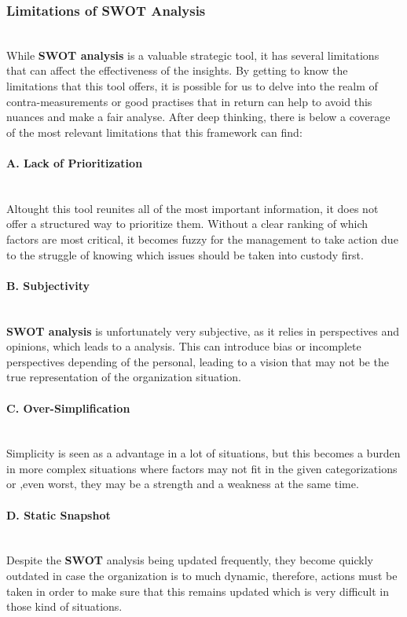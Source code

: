 \subsubsection{Limitations of SWOT Analysis}\mbox{}\\
While \textbf{SWOT analysis} is a valuable strategic tool, it has several limitations that can affect the effectiveness of the insights. By getting to know the limitations that this tool offers, it is possible for us to delve into the realm of contra-measurements or good practises that in return can help to avoid this nuances and make a fair analyse. After deep thinking, there is below a coverage of the most relevant limitations that this framework can find:

\paragraph{A. Lack of Prioritization}\mbox{}\\
Altought this tool reunites all of the most important information, it does not offer a structured way to prioritize them. Without a clear ranking of which factors are most critical, it becomes fuzzy for the management to take action due to the struggle of knowing which issues should be taken into custody first.

\paragraph{B. Subjectivity}\mbox{}\\
\textbf{SWOT analysis} is unfortunately very subjective, as it relies in perspectives and opinions, which leads to a analysis. This can introduce bias or incomplete perspectives depending of the personal, leading to a vision that may not be the true representation of the organization situation. 

\paragraph{C. Over-Simplification}\mbox{}\\
Simplicity is seen as a advantage in a lot of situations, but this becomes a burden in more complex situations where factors may not fit in the given categorizations or ,even worst, they may be a strength and a weakness at the same time.

\paragraph{D. Static Snapshot}\mbox{}\\
Despite the \textbf{SWOT} analysis being updated frequently, they become quickly outdated in case the organization is to much dynamic, therefore, actions must be taken in order to make sure that this remains updated which is very difficult in those kind of situations.

